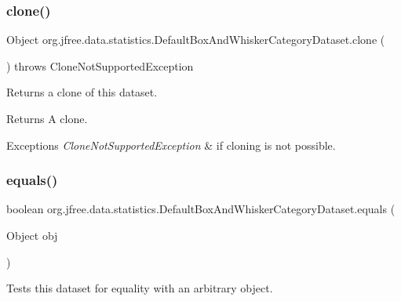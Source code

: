 \subsubsection{\texorpdfstring{clone()}{clone()}}
{\footnotesize\ttfamily Object org.\+jfree.\+data.\+statistics.\+Default\+Box\+And\+Whisker\+Category\+Dataset.\+clone (\begin{DoxyParamCaption}{ }\end{DoxyParamCaption}) throws Clone\+Not\+Supported\+Exception}

Returns a clone of this dataset.

\begin{DoxyReturn}{Returns}
A clone.
\end{DoxyReturn}

\begin{DoxyExceptions}{Exceptions}
{\em Clone\+Not\+Supported\+Exception} & if cloning is not possible. \\
\hline
\end{DoxyExceptions}
\mbox{\label{classorg_1_1jfree_1_1data_1_1statistics_1_1_default_box_and_whisker_category_dataset_a16046d71d25b86c454dd34f11ea52213}} 
\subsubsection{\texorpdfstring{equals()}{equals()}}
{\footnotesize\ttfamily boolean org.\+jfree.\+data.\+statistics.\+Default\+Box\+And\+Whisker\+Category\+Dataset.\+equals (\begin{DoxyParamCaption}\item[{Object}]{obj }\end{DoxyParamCaption})}

Tests this dataset for equality with an arbitrary object.


